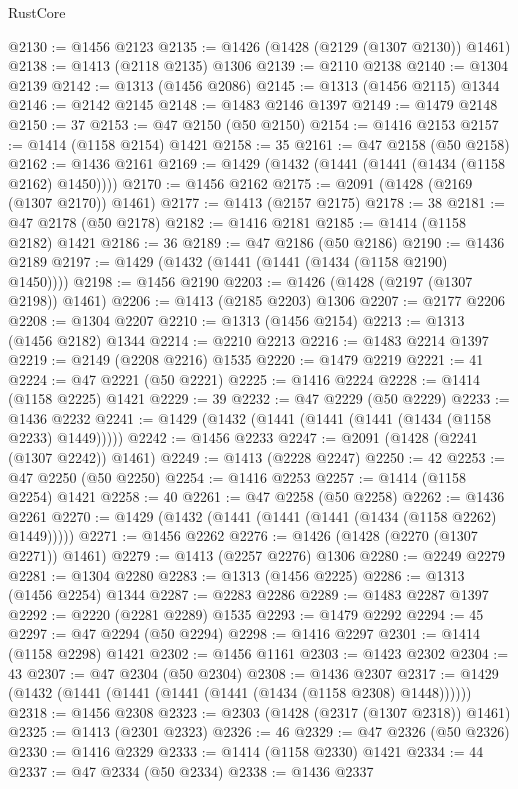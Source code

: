 \begin{lexlean}{RustCore}
\begin{coremodule}
@2130 := @1456 @2123
@2135 := @1426 (@1428 (@2129 (@1307 @2130)) @1461)
@2138 := @1413 (@2118 @2135) @1306
@2139 := @2110 @2138
@2140 := @1304 @2139
@2142 := @1313 (@1456 @2086)
@2145 := @1313 (@1456 @2115) @1344
@2146 := @2142 @2145
@2148 := @1483 @2146 @1397
@2149 := @1479 @2148
@2150 := 37
@2153 := @47 @2150 (@50 @2150)
@2154 := @1416 @2153
@2157 := @1414 (@1158 @2154) @1421
@2158 := 35
@2161 := @47 @2158 (@50 @2158)
@2162 := @1436 @2161
@2169 := @1429 (@1432 (@1441 (@1441 (@1434 (@1158 @2162) @1450))))
@2170 := @1456 @2162
@2175 := @2091 (@1428 (@2169 (@1307 @2170)) @1461)
@2177 := @1413 (@2157 @2175)
@2178 := 38
@2181 := @47 @2178 (@50 @2178)
@2182 := @1416 @2181
@2185 := @1414 (@1158 @2182) @1421
@2186 := 36
@2189 := @47 @2186 (@50 @2186)
@2190 := @1436 @2189
@2197 := @1429 (@1432 (@1441 (@1441 (@1434 (@1158 @2190) @1450))))
@2198 := @1456 @2190
@2203 := @1426 (@1428 (@2197 (@1307 @2198)) @1461)
@2206 := @1413 (@2185 @2203) @1306
@2207 := @2177 @2206
@2208 := @1304 @2207
@2210 := @1313 (@1456 @2154)
@2213 := @1313 (@1456 @2182) @1344
@2214 := @2210 @2213
@2216 := @1483 @2214 @1397
@2219 := @2149 (@2208 @2216) @1535
@2220 := @1479 @2219
@2221 := 41
@2224 := @47 @2221 (@50 @2221)
@2225 := @1416 @2224
@2228 := @1414 (@1158 @2225) @1421
@2229 := 39
@2232 := @47 @2229 (@50 @2229)
@2233 := @1436 @2232
@2241 := @1429 (@1432 (@1441 (@1441 (@1441 (@1434 (@1158 @2233) @1449)))))
@2242 := @1456 @2233
@2247 := @2091 (@1428 (@2241 (@1307 @2242)) @1461)
@2249 := @1413 (@2228 @2247)
@2250 := 42
@2253 := @47 @2250 (@50 @2250)
@2254 := @1416 @2253
@2257 := @1414 (@1158 @2254) @1421
@2258 := 40
@2261 := @47 @2258 (@50 @2258)
@2262 := @1436 @2261
@2270 := @1429 (@1432 (@1441 (@1441 (@1441 (@1434 (@1158 @2262) @1449)))))
@2271 := @1456 @2262
@2276 := @1426 (@1428 (@2270 (@1307 @2271)) @1461)
@2279 := @1413 (@2257 @2276) @1306
@2280 := @2249 @2279
@2281 := @1304 @2280
@2283 := @1313 (@1456 @2225)
@2286 := @1313 (@1456 @2254) @1344
@2287 := @2283 @2286
@2289 := @1483 @2287 @1397
@2292 := @2220 (@2281 @2289) @1535
@2293 := @1479 @2292
@2294 := 45
@2297 := @47 @2294 (@50 @2294)
@2298 := @1416 @2297
@2301 := @1414 (@1158 @2298) @1421
@2302 := @1456 @1161
@2303 := @1423 @2302
@2304 := 43
@2307 := @47 @2304 (@50 @2304)
@2308 := @1436 @2307
@2317 := @1429 (@1432 (@1441 (@1441 (@1441 (@1441 (@1434 (@1158 @2308) @1448))))))
@2318 := @1456 @2308
@2323 := @2303 (@1428 (@2317 (@1307 @2318)) @1461)
@2325 := @1413 (@2301 @2323)
@2326 := 46
@2329 := @47 @2326 (@50 @2326)
@2330 := @1416 @2329
@2333 := @1414 (@1158 @2330) @1421
@2334 := 44
@2337 := @47 @2334 (@50 @2334)
@2338 := @1436 @2337

\end{coremodule}
\end{lexlean}

